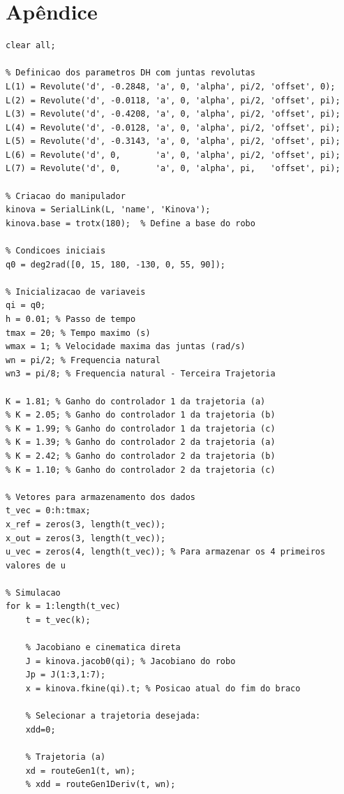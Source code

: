 \documentclass[10pt]{article}
\begin{document}
\newpage

\section*{Apêndice}

\begin{lstlisting}[caption={Código da primeira parte do trabalho}, label={code:subsecao21}]
clear all;

% Definicao dos parametros DH com juntas revolutas
L(1) = Revolute('d', -0.2848, 'a', 0, 'alpha', pi/2, 'offset', 0);
L(2) = Revolute('d', -0.0118, 'a', 0, 'alpha', pi/2, 'offset', pi);
L(3) = Revolute('d', -0.4208, 'a', 0, 'alpha', pi/2, 'offset', pi);
L(4) = Revolute('d', -0.0128, 'a', 0, 'alpha', pi/2, 'offset', pi);
L(5) = Revolute('d', -0.3143, 'a', 0, 'alpha', pi/2, 'offset', pi);
L(6) = Revolute('d', 0,       'a', 0, 'alpha', pi/2, 'offset', pi);
L(7) = Revolute('d', 0,       'a', 0, 'alpha', pi,   'offset', pi);

% Criacao do manipulador
kinova = SerialLink(L, 'name', 'Kinova');
kinova.base = trotx(180);  % Define a base do robo

% Condicoes iniciais
q0 = deg2rad([0, 15, 180, -130, 0, 55, 90]);

% Inicializacao de variaveis
qi = q0;
h = 0.01; % Passo de tempo
tmax = 20; % Tempo maximo (s)
wmax = 1; % Velocidade maxima das juntas (rad/s)
wn = pi/2; % Frequencia natural
wn3 = pi/8; % Frequencia natural - Terceira Trajetoria

K = 1.81; % Ganho do controlador 1 da trajetoria (a)
% K = 2.05; % Ganho do controlador 1 da trajetoria (b)
% K = 1.99; % Ganho do controlador 1 da trajetoria (c)
% K = 1.39; % Ganho do controlador 2 da trajetoria (a)
% K = 2.42; % Ganho do controlador 2 da trajetoria (b)
% K = 1.10; % Ganho do controlador 2 da trajetoria (c)

% Vetores para armazenamento dos dados
t_vec = 0:h:tmax;
x_ref = zeros(3, length(t_vec));
x_out = zeros(3, length(t_vec));
u_vec = zeros(4, length(t_vec)); % Para armazenar os 4 primeiros valores de u

% Simulacao
for k = 1:length(t_vec)
    t = t_vec(k);
    
    % Jacobiano e cinematica direta
    J = kinova.jacob0(qi); % Jacobiano do robo
    Jp = J(1:3,1:7);
    x = kinova.fkine(qi).t; % Posicao atual do fim do braco
    
    % Selecionar a trajetoria desejada:
    xdd=0;
    
    % Trajetoria (a)
    xd = routeGen1(t, wn);
    % xdd = routeGen1Deriv(t, wn);
    

\end{lstlisting}
\end{document}
